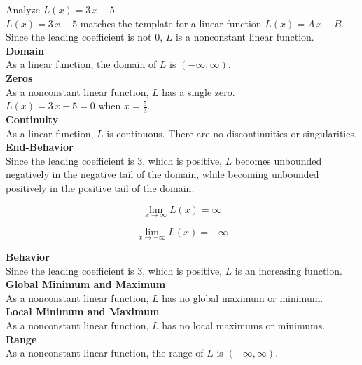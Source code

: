 \documentclass{ximera}
\begin{document}
\begin{example}

Analyze $L(x) = 3 \, x - 5$  \\


$L(x) = 3 \, x - 5$ matches the template for a linear function $L(x) = A \, x + B$.\\
Since the leading coefficient is not $0$, $L$ is a nonconstant linear function.\\



\textbf{Domain} \\

As a linear function, the domain of $L$ is $(-\infty, \infty)$.\\


\textbf{Zeros} \\

As a nonconstant linear function, $L$ has a single zero.\\

$L(x) = 3 \, x - 5 = 0$ when $x = \frac{5}{3}$. \\


\textbf{Continuity} \\

As a linear function, $L$ is continuous.  There are no discontinuities or singularities. \\



\textbf{End-Behavior} \\

Since the leading coefficient is $3$, which is positive, $L$ becomes unbounded negatively in the negative tail of the domain, while becoming unbounded positively in the positive tail of the domain.


\[
\lim\limits_{x \to \infty} L(x) = \infty
\]

\[
\lim\limits_{x \to -\infty} L(x) = -\infty
\]


\textbf{Behavior} \\

Since the leading coefficient is $3$, which is positive, $L$ is an increasing function. \\



\textbf{Global Minimum and Maximum} \\

As a nonconstant linear function, $L$ has no global maximum or minimum. \\



\textbf{Local Minimum and Maximum} \\

As a nonconstant linear function, $L$ has no local maximums or minimums. \\



\textbf{Range} \\

As a nonconstant linear function, the range of $L$ is $(-\infty, \infty)$. \\



\end{example}
\end{document}

